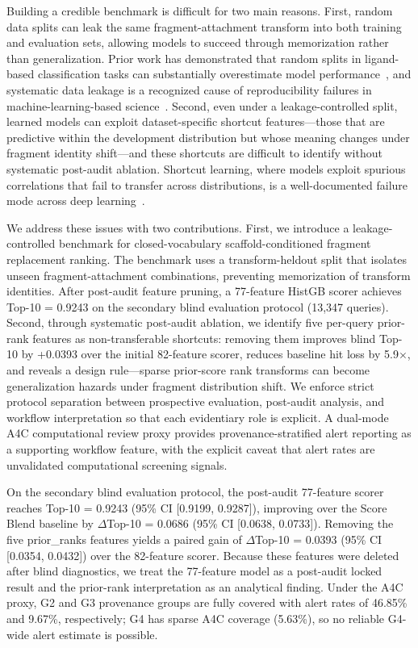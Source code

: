 \documentclass[12pt,letterpaper]{article}
\begin{document}
Building a credible benchmark is difficult for two main reasons. First, random data splits can leak the same fragment-attachment transform into both training and evaluation sets, allowing models to succeed through memorization rather than generalization. Prior work has demonstrated that random splits in ligand-based classification tasks can substantially overestimate model performance~\cite{wallach2018most}, and systematic data leakage is a recognized cause of reproducibility failures in machine-learning-based science~\cite{kapoor2023leakage}. Second, even under a leakage-controlled split, learned models can exploit dataset-specific shortcut features---those that are predictive within the development distribution but whose meaning changes under fragment identity shift---and these shortcuts are difficult to identify without systematic post-audit ablation. Shortcut learning, where models exploit spurious correlations that fail to transfer across distributions, is a well-documented failure mode across deep learning~\cite{geirhos2020shortcut}.

We address these issues with two contributions. First, we introduce a leakage-controlled benchmark for closed-vocabulary scaffold-conditioned fragment replacement ranking. The benchmark uses a transform-heldout split that isolates unseen fragment-attachment combinations, preventing memorization of transform identities. After post-audit feature pruning, a 77-feature HistGB scorer achieves Top-10 = 0.9243 on the secondary blind evaluation protocol (13,347 queries). Second, through systematic post-audit ablation, we identify five per-query prior-rank features as non-transferable shortcuts: removing them improves blind Top-10 by +0.0393 over the initial 82-feature scorer, reduces baseline hit loss by 5.9$\times$, and reveals a design rule---sparse prior-score rank transforms can become generalization hazards under fragment distribution shift. We enforce strict protocol separation between prospective evaluation, post-audit analysis, and workflow interpretation so that each evidentiary role is explicit. A dual-mode A4C computational review proxy provides provenance-stratified alert reporting as a supporting workflow feature, with the explicit caveat that alert rates are unvalidated computational screening signals.

On the secondary blind evaluation protocol, the post-audit 77-feature scorer reaches Top-10 = 0.9243 (95\% CI [0.9199, 0.9287]), improving over the Score Blend baseline by $\Delta$Top-10 = 0.0686 (95\% CI [0.0638, 0.0733]). Removing the five prior\_ranks features yields a paired gain of $\Delta$Top-10 = 0.0393 (95\% CI [0.0354, 0.0432]) over the 82-feature scorer. Because these features were deleted after blind diagnostics, we treat the 77-feature model as a post-audit locked result and the prior-rank interpretation as an analytical finding. Under the A4C proxy, G2 and G3 provenance groups are fully covered with alert rates of 46.85\% and 9.67\%, respectively; G4 has sparse A4C coverage (5.63\%), so no reliable G4-wide alert estimate is possible.
\end{document}
